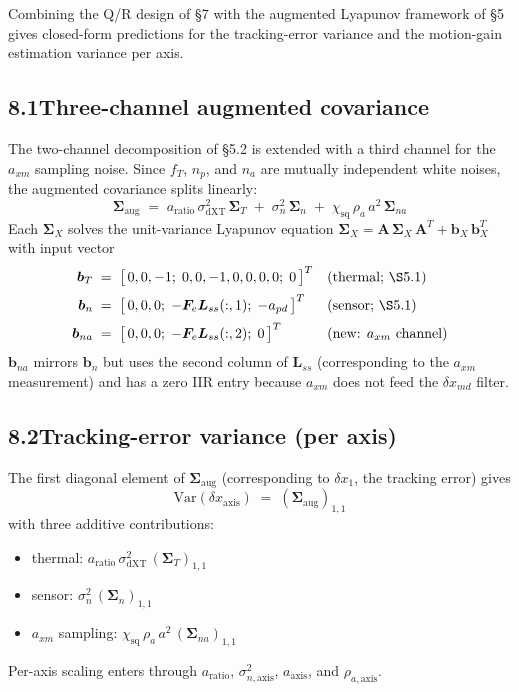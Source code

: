 \documentclass[11pt]{article}
\newcommand{\T}{^{T}}
\begin{document}
Combining the Q/R design of \S7 with the augmented Lyapunov framework of \S5 gives closed-form predictions for the tracking-error variance and the motion-gain estimation variance per axis.

\subsection*{8.1\quad Three-channel augmented covariance}

The two-channel decomposition of \S5.2 is extended with a third channel for the $a_{xm}$ sampling noise. Since $f_T$, $n_p$, and $n_a$ are mutually independent white noises, the augmented covariance splits linearly:
\begin{equation}
\boxed{\;\bm{\Sigma}_\mathrm{aug} \;=\; a_\mathrm{ratio}\,\sigma^2_\mathrm{dXT}\,\bm{\Sigma}_T
\;+\; \sigma^2_n\,\bm{\Sigma}_n
\;+\; \chi_\mathrm{sq}\,\rho_a\,a^2\,\bm{\Sigma}_{na}\;}
\end{equation}
Each $\bm{\Sigma}_X$ solves the unit-variance Lyapunov equation $\bm{\Sigma}_X = \bm{A}\,\bm{\Sigma}_X\,\bm{A}\T + \bm{b}_X\,\bm{b}_X\T$ with input vector
\begin{align*}
\bm{b}_T    &\;=\; \bigl[\,0,0,-1;\; 0,0,-1,0,0,0,0;\; 0\,\bigr]\T
  && \text{(thermal; \S5.1)} \\[2pt]
\bm{b}_n    &\;=\; \bigl[\,0,0,0;\; -\bm{F}_e\bm{L}_{ss}(:,1);\; -a_{pd}\,\bigr]\T
  && \text{(sensor; \S5.1)} \\[2pt]
\bm{b}_{na} &\;=\; \bigl[\,0,0,0;\; -\bm{F}_e\bm{L}_{ss}(:,2);\; 0\,\bigr]\T
  && \text{(new: $a_{xm}$ channel)}
\end{align*}
$\bm{b}_{na}$ mirrors $\bm{b}_n$ but uses the second column of $\bm{L}_{ss}$ (corresponding to the $a_{xm}$ measurement) and has a zero IIR entry because $a_{xm}$ does not feed the $\delta x_{md}$ filter.

\subsection*{8.2\quad Tracking-error variance (per axis)}

The first diagonal element of $\bm{\Sigma}_\mathrm{aug}$ (corresponding to $\delta x_1$, the tracking error) gives
\begin{equation}
\boxed{\;\mathrm{Var}(\delta x_\mathrm{axis}) \;=\; (\bm{\Sigma}_\mathrm{aug})_{1,1}\;}
\end{equation}
with three additive contributions:
\begin{itemize}\itemsep0pt
\item thermal: $a_\mathrm{ratio}\,\sigma^2_\mathrm{dXT}\,(\bm{\Sigma}_T)_{1,1}$
\item sensor: $\sigma^2_n\,(\bm{\Sigma}_n)_{1,1}$
\item $a_{xm}$ sampling: $\chi_\mathrm{sq}\,\rho_a\,a^2\,(\bm{\Sigma}_{na})_{1,1}$
\end{itemize}
Per-axis scaling enters through $a_\mathrm{ratio}$, $\sigma^2_{n,\mathrm{axis}}$, $a_\mathrm{axis}$, and $\rho_{a,\mathrm{axis}}$.
\end{document}
